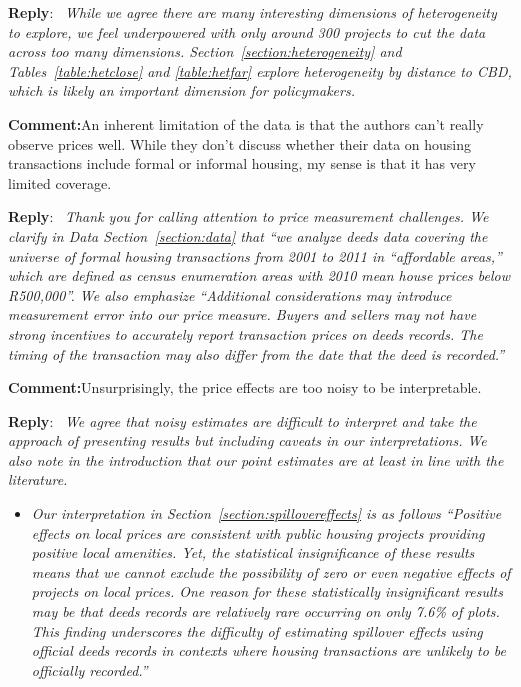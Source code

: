 \documentclass{article}
\newcounter{reviewer}
\newcounter{point}[reviewer]
\newcommand{\reply}{\medskip \noindent \textbf{Reply}:\ \textit }
\newcommand{\sr}{\begin{minipage}{\dimexpr\textwidth-3cm}}
\newcommand{\er}{\end{minipage}}
\newcommand{\cc}{\medskip \noindent \textbf{Comment:}\hspace{2em}}
\begin{document}
\sr
\reply{ While we agree there are many interesting dimensions of heterogeneity to explore, we feel underpowered with only around 300 projects to cut the data across too many dimensions.  Section~\ref{section:heterogeneity} and Tables~\ref{table:hetclose} and \ref{table:hetfar} explore heterogeneity by distance to CBD, which is likely an important dimension for policymakers. }\\
\er

\cc An inherent limitation of the data is that the authors can’t really observe prices well. While they don’t discuss whether their data on housing transactions include formal or informal housing, my sense is that it has very limited coverage. 

\sr
\reply{ Thank you for calling attention to price measurement challenges. We clarify in  Data Section~\ref{section:data} that ``we analyze deeds data covering the universe of formal housing transactions from 2001 to 2011 in ``affordable areas,'' which are defined as census enumeration areas with 2010 mean house prices below R500,000''.  We also emphasize ``Additional considerations may introduce measurement error into our price measure. Buyers and sellers may not have strong incentives to accurately report transaction prices on deeds records.  The timing of the transaction may also differ from the date that the deed is recorded.'' }\\
\er

\cc Unsurprisingly, the price effects are too noisy to be interpretable.

\sr
\reply{ We agree that noisy estimates are difficult to interpret and take the approach of presenting results but including caveats in our interpretations.  We also note in the introduction that our point estimates are at least in line with the literature.     }
\begin{itemize}
    \item \textit{Our interpretation in Section~\ref{section:spillovereffects} is as follows ``Positive effects on local prices are consistent with public housing projects providing positive local amenities.  Yet, the statistical insignificance of these results means that we cannot exclude the possibility of zero or even negative effects of projects on local prices.  One reason for these statistically insignificant results may be that deeds records are relatively rare occurring on only 7.6\% of plots.  This finding underscores the difficulty of estimating spillover effects using official deeds records in contexts where housing transactions are unlikely to be officially recorded.''}
\end{itemize}
\er\\
\end{document}
